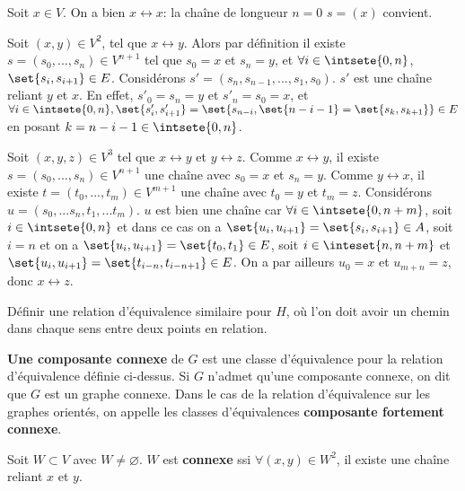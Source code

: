 \documentclass{scrartcl}
\begin{document}
			\begin{demo}
				\item Soit $x \in V$. On a bien $x\leftrightarrow x$: la chaîne de longueur $n=0$ $s = (x)$ convient.
				\item Soit $(x,y) \in V^2$, tel que $x \leftrightarrow y$. 
					Alors par définition il existe $s = (s_0,...,s_n) \in V^{n+1}$ tel que $s_0 = x$ et $s_n = y$,
					et $\forall i \in \intsete{0,n}$, $\set{s_i,s_{i+1}} \in E$.
					Considérons $s' = (s_n,s_{n-1},...,s_1,s_0)$. $s'$ est une chaîne reliant $y$ et $x$.
					En effet, $s'_0 = s_n = y$ et $s'_n = s_0 = x$, et $\forall i \in \intsete{0,n}, 
					\set{s'_{i},s'_{i+1}} = \set{s_{n-i},\set{n-i-1} = \set{s_k,s_{k+1}}} \in E$ en posant $k = n-i-1 \in \intsete{0,n}$.
				\item Soit $(x,y,z) \in V^3$ tel que $x\leftrightarrow y$ et $y\leftrightarrow z$.
					Comme $x\leftrightarrow y$, il existe $s = (s_0,...,s_n) \in V^{n+1}$ une chaîne avec $s_0 = x$ et $s_n = y$.
					Comme $y\leftrightarrow x$, il existe $t = (t_0,...,t_m) \in V^{m+1}$ une chaîne avec $t_0 = y$ et $t_m = z$.
					Considérons $u = (s_0,...s_n,t_1,...t_m)$.
					$u$ est bien une chaîne car $\forall i \in \intsete{0,n+m}$, soit $i \in \intsete{0,n}$ et dans ce cas on a 
					$\set{u_i, u_{i+1}} = \set{s_i,s_{i+1}} \in A$, soit $i = n$ et on a $\set{u_i,u_{i+1}} = \set{t_0,t_1} \in E$,
					soit $i \in \inteset{n,n+m}$ et $\set{u_i,u_{i+1}} = \set{t_{i-n},t_{i-n+1}} \in E$.
					On a par ailleurs $u_0 = x$ et $u_{m+n} = z$, donc $x\leftrightarrow z$.
			\end{demo}

			\exo Définir une relation d'équivalence similaire pour $H$, où l'on doit avoir un chemin dans chaque sens entre deux points en relation.

			 \textbf{Une composante connexe} de $G$ est une classe d'équivalence pour la relation d'équivalence définie ci-dessus.
			Si $G$ n'admet qu'une composante connexe, on dit que $G$ est un graphe connexe. 
			Dans le cas de la relation d'équivalence sur les graphes orientés, on appelle les classes d'équivalences \textbf{composante fortement connexe}.

			 Soit $W \subset V$ avec $W \neq \varnothing$. 
			$W$ est \textbf{connexe} ssi $\forall(x,y) \in W^2$, il existe une chaîne reliant $x$ et $y$.
\end{document}
